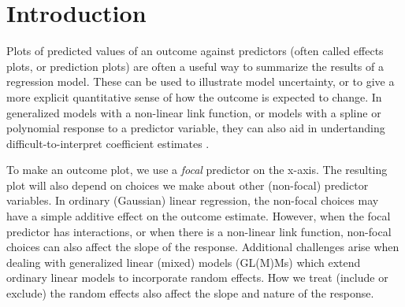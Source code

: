 
\linenumbers

\section{Introduction}

Plots of predicted values of an outcome against predictors (often called effects plots, or prediction plots) are often a useful way to summarize the results of a regression model. These can be used to illustrate model uncertainty, or to give a more explicit quantitative sense of how the outcome is expected to change. In generalized models with a non-linear link function, or models with a spline or polynomial response to a predictor variable, they can also aid in undertanding difficult-to-interpret coefficient estimates \citep{brambor_understanding_2006, berry_improving_2012, leeper2017interpreting}. 

To make an outcome plot, we use a \emph{focal} predictor on the x-axis. The resulting plot will also depend on choices we make about other (non-focal) predictor variables. In ordinary (Gaussian) linear regression, the non-focal choices may have a simple additive effect on the outcome estimate. However, when the focal predictor has interactions, or when there is a non-linear link function, non-focal choices can also affect the slope of the response. Additional challenges arise when dealing with generalized linear (mixed) models (GL(M)Ms) which extend ordinary linear models to incorporate random effects. How we treat (include or exclude) the random effects also affect the slope and nature of the response.





